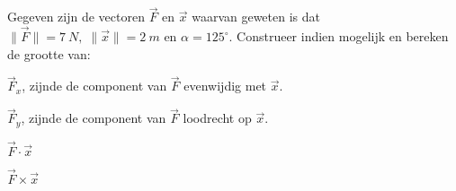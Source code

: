 \documentclass{ximera}
\begin{document}
\begin{exercise}

Gegeven zijn de vectoren \(\vec{F}\) en \(\vec{x}\) waarvan geweten is dat \(\| \vec{F} \| = \SI{7}{N}, \; \|\vec{x}\| = \SI{2}{m} \text{ en } \alpha = 125^\circ \).
Construeer indien mogelijk en bereken de grootte van: 

	\begin{image}[0.2\textwidth]
		\end{image}

\begin{question}
	\(\vec{F}_x\), zijnde de component van \(\vec{F}\) evenwijdig met \(\vec{x}\). 
\end{question}

\begin{question}
	\(\vec{F}_y\), zijnde de component van \(\vec{F}\) loodrecht op \(\vec{x}\). 
\end{question}

\begin{question}
	\(\vec{F} \cdot \vec{x}\)
\end{question}

\begin{question}
	\(\vec{F} \times \vec{x}\)
\end{question}
\end{exercise}
\end{document}
